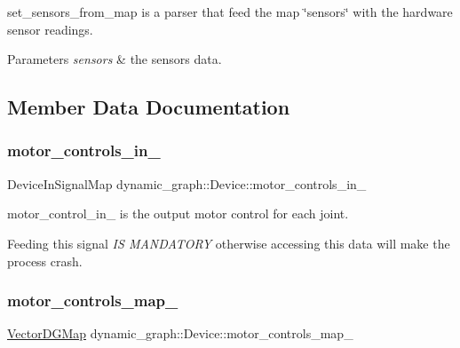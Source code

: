 set\+\_\+sensors\+\_\+from\+\_\+map is a parser that feed the map \char`\"{}sensors\char`\"{} with the hardware sensor readings. 


\begin{DoxyParams}{Parameters}
{\em sensors} & the sensors data. \\
\hline
\end{DoxyParams}


\subsection{Member Data Documentation}
\mbox{\label{classdynamic__graph_1_1Device_a77f0617d7b53fb47d77af7557521daf4}} 
\subsubsection{\texorpdfstring{motor\+\_\+controls\+\_\+in\+\_\+}{motor\_controls\_in\_}}
{\footnotesize\ttfamily Device\+In\+Signal\+Map dynamic\+\_\+graph\+::\+Device\+::motor\+\_\+controls\+\_\+in\+\_\+}



motor\+\_\+control\+\_\+in\+\_\+ is the output motor control for each joint. 

Feeding this signal {\itshape IS M\+A\+N\+D\+A\+T\+O\+RY} otherwise accessing this data will make the process crash. \mbox{\label{classdynamic__graph_1_1Device_a9d866a7e294a7445fb88dee8d8a80851}} 
\subsubsection{\texorpdfstring{motor\+\_\+controls\+\_\+map\+\_\+}{motor\_controls\_map\_}}
{\footnotesize\ttfamily \hyperlink{namespacedynamic__graph_a51212ed7fa4ae81e7b362a27f09b7ab8}{Vector\+D\+G\+Map} dynamic\+\_\+graph\+::\+Device\+::motor\+\_\+controls\+\_\+map\+\_\+}



